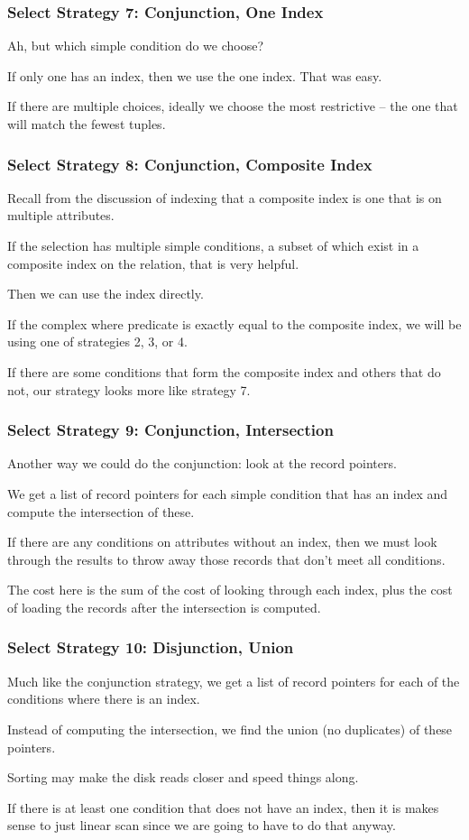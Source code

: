\begin{frame}
\frametitle{Select Strategy 7: Conjunction, One Index}
Ah, but which simple condition do we choose? 

If only one has an index, then we use the one index. That was easy. 

If there are multiple choices, ideally we choose the most restrictive -- the one that will match the fewest tuples. 

\end{frame}



\begin{frame}
\frametitle{Select Strategy 8: Conjunction, Composite Index}
Recall from the discussion of indexing that a composite index is one that is on multiple attributes. 

If the selection has multiple simple conditions, a subset of which exist in a composite index on the relation, that is very helpful. 

Then we can use the index directly. 

If the complex where predicate is exactly equal to the composite index, we will be using one of strategies 2, 3, or 4. 

If there are some conditions that form the composite index and others that do not, our strategy looks more like strategy 7.

\end{frame}

\begin{frame}
\frametitle{Select Strategy 9: Conjunction, Intersection}
Another way we could do the conjunction: look at the record pointers. 

We get a list of record pointers for each simple condition that has an index and compute the intersection of these. 

If there are any conditions on attributes without an index, then we must look through the results to throw away those records that don't meet all conditions.

The cost here is the sum of the cost of looking through each index, plus the cost of loading the records after the intersection is computed. 

\end{frame}

\begin{frame}
\frametitle{Select Strategy 10: Disjunction, Union}
Much like the conjunction strategy, we get a list of record pointers for each of the conditions where there is an index. 

Instead of computing the intersection, we find the union (no duplicates) of these pointers. 

Sorting may make the disk reads closer and speed things along.

If there is at least one condition that does not have an index, then it is makes sense to just linear scan since we are going to have to do that anyway.

\end{frame}

